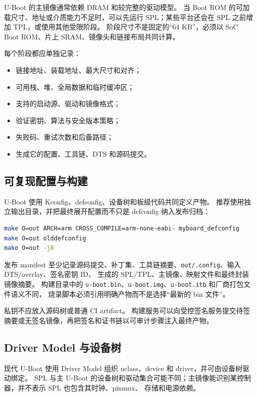 U-Boot 的主镜像通常依赖 DRAM 和较完整的驱动模型。
当 Boot ROM 的可加载尺寸、地址或介质能力不足时，可以先运行 SPL；某些平台还会在 SPL 之前增加 TPL，或使用其他受限阶段。
阶段尺寸不是固定的“64 KB”，必须以 SoC Boot ROM、片上 SRAM、镜像头和链接布局共同计算。

每个阶段都应单独记录：

\begin{itemize}
  \item 链接地址、装载地址、最大尺寸和对齐；
  \item 可用栈、堆、全局数据和临时缓冲区；
  \item 支持的启动源、驱动和镜像格式；
  \item 验证密钥、算法与安全版本策略；
  \item 失败码、重试次数和后备路径；
  \item 生成它的配置、工具链、DTS 和源码提交。
\end{itemize}

\subsection{可复现配置与构建}

U-Boot 使用 Kconfig、defconfig、设备树和板级代码共同定义产物。
推荐使用独立输出目录，并把最终展开配置而不只是 defconfig 纳入发布归档：

\begin{lstlisting}[language=bash,caption={U-Boot 独立输出目录构建示例}]
make O=out ARCH=arm CROSS_COMPILE=arm-none-eabi- myboard_defconfig
make O=out olddefconfig
make O=out -j8
\end{lstlisting}

发布 manifest 至少记录源码提交、补丁集、工具链摘要、\texttt{out/.config}、输入 DTS/overlay、签名密钥 ID、
生成的 SPL/TPL、主镜像、映射文件和最终封装镜像摘要。
构建目录中的 \texttt{u-boot.bin}、\texttt{u-boot.img}、\texttt{u-boot.itb} 和厂商打包文件语义不同，
烧录脚本必须引用明确产物而不是选择“最新的 bin 文件”。

私钥不应放入源码树或普通 CI artifact。
构建服务可以向受控签名服务提交待签摘要或无签名镜像，再把签名和证书链以可审计步骤注入最终产物。

\subsection{Driver Model 与设备树}

现代 U-Boot 使用 Driver Model 组织 uclass、device 和 driver，并可由设备树驱动绑定。
SPL 与主 U-Boot 的设备树和驱动集合可能不同；主镜像能识别某控制器，并不表示 SPL 也包含其时钟、pinmux、
存储和电源依赖。

